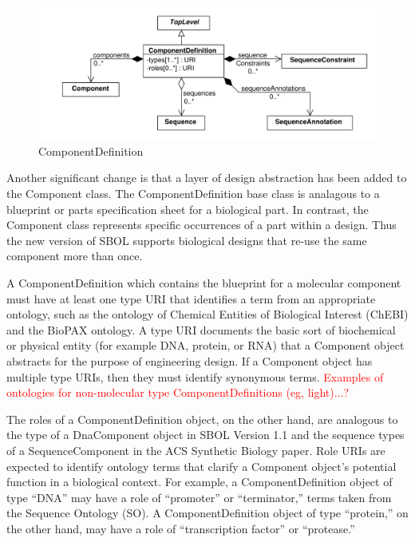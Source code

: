 \documentclass[draftspec]{sbmlpkgspec}
\begin{document}
\begin{figure}[ht]
\begin{center}
\includegraphics[width=\textwidth]{uml/component_definition}
\caption[]{ComponentDefinition}
\label{uml:component_definition}
\end{center}
\end{figure}

Another significant change is that a layer of design abstraction has been added to the Component class.  The ComponentDefinition base class is analagous to a blueprint or parts specification sheet for a biological part.  In contrast, the Component class represents specific occurrences of a part within a design.  Thus the new version of SBOL supports biological designs that re-use the same component more than once. 

A ComponentDefinition which contains the blueprint for a molecular component must have at least one type URI that identifies a term from an appropriate ontology, such as the ontology of Chemical Entities of Biological Interest (ChEBI) and the BioPAX ontology. A type URI documents the basic sort of biochemical or physical entity (for example DNA, protein, or RNA) that a Component object abstracts for the purpose of engineering design. If a Component object has multiple type URIs, then they must identify synonymous terms.
\textcolor{red}{Examples of ontologies for non-molecular type ComponentDefinitions (eg, light)...?}

The roles of a ComponentDefinition object, on the other hand, are analogous to the type of a DnaComponent object in SBOL Version 1.1 and the sequence types of a SequenceComponent in the ACS Synthetic Biology paper. Role URIs are expected to identify ontology terms that clarify a Component object’s potential function in a biological context. For example, a ComponentDefinition object of type “DNA” may have a role of “promoter” or “terminator,” terms taken from the Sequence Ontology (SO). A ComponentDefinition object of type “protein,” on the other hand, may have a role of “transcription factor” or “protease.” 
\end{document}
